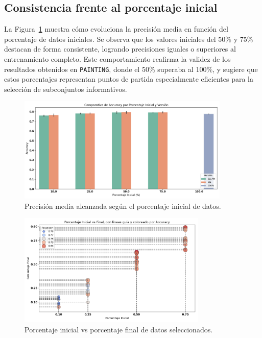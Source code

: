 \subsection{Consistencia frente al porcentaje inicial}
La Figura~\ref{fig:cifar10_porcentaje} muestra cómo evoluciona la precisión media en función del porcentaje de datos iniciales.
Se observa que los valores iniciales del 50\% y 75\% destacan de forma consistente, logrando precisiones iguales o superiores al entrenamiento completo.
Este comportamiento reafirma la validez de los resultados obtenidos en \texttt{PAINTING}, donde el 50\% superaba al 100\%,
y sugiere que estos porcentajes representan puntos de partida especialmente eficientes para la selección de subconjuntos informativos.

\begin{figure}[htp]
    \centering
    \includegraphics[width=0.9\textwidth]{imagenes/evaluaciones/cifar10/comparacion_por_porcentaje.png}
    \caption{Precisión media alcanzada según el porcentaje inicial de datos.}
    \label{fig:cifar10_porcentaje}
\end{figure}

\begin{figure}[htp]
    \centering
    \includegraphics[width=0.8\textwidth]{imagenes/evaluaciones/cifar10/scatter.png}
    \caption{Porcentaje inicial vs porcentaje final de datos seleccionados.}
    \label{fig:cifar10_scatter}
\end{figure}

